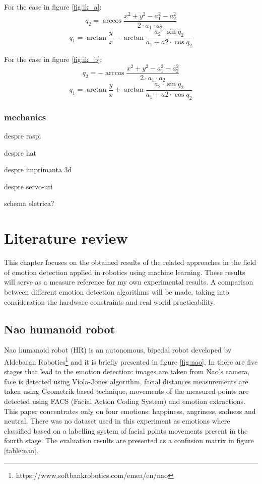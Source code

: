 \documentclass[runningheads,a4paper,12pt]{report}
\begin{document}
For the case in figure \ref{fig:ik_a}:
\[
    q_2 = \arccos \frac{x^2 + y^2 - a_1^2 - a_2^2}{2 \cdot a_1 \cdot a_2}    
\]
\[
    q_1 = \arctan \frac{y}{x} - \arctan \frac{a_2 \cdot \sin q_2}{a_1 + a2 \cdot \cos q_2}
\]

For the case in figure \ref{fig:ik_b}:
\[
    q_2 = - \arccos \frac{x^2 + y^2 - a_1^2 - a_2^2}{2 \cdot a_1 \cdot a_2}    
\]
\[
    q_1 = \arctan \frac{y}{x} + \arctan \frac{a_2 \cdot \sin q_2}{a_1 + a2 \cdot \cos q_2}
\]

\subsection{mechanics}
despre raspi

despre hat

despre imprimanta 3d

despre servo-uri

schema eletrica?

\chapter{Literature review}
\label{chapter:literature}
This chapter focuses on the obtained results of the related approaches in the field of emotion detection applied in robotics using machine learning. These results will serve as a measure reference for my own experimental results. A comparison between different emotion detection algorithms will be made, taking into consideration the hardware constraints and real world practicability. 

\section{Nao humanoid robot}
Nao humanoid robot (HR) is an autonomous, bipedal robot developed by Aldebaran Robotics\footnote{https://www.softbankrobotics.com/emea/en/nao} and it is briefly presented in figure \ref{fig:nao}. In \cite{nao-emotion} there are five stages that lead to the emotion detection: images are taken from Nao's camera, face is detected using Viola-Jones algorithm, facial distances measurements are taken using Geometrik based technique, movements of the measured points are detected using FACS (Facial Action Coding System) and emotion extractions. This paper concentrates only on four emotions: happiness, angriness, sadness and neutral. There was no dataset used in this experiment as emotions where classified based on a labelling system of facial points movements present in the fourth stage. The evaluation results are presented as a confusion matrix in figure \ref{table:nao}.
\end{document}
